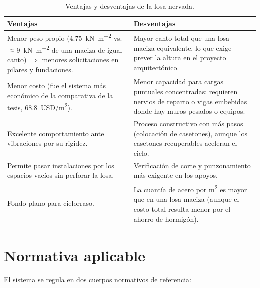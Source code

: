 \begin{table}[H]
\centering
\caption{Ventajas y desventajas de la losa nervada.}
\label{tab:ventajas}
\begin{tabular}{p{}p{}}
\toprule
\textbf{Ventajas} & \textbf{Desventajas} \\
\midrule
Menor peso propio (\SI{4,75}{\kilo\newton\per\square\meter} vs.\
$\approx$\SI{9}{\kilo\newton\per\square\meter} de una maciza de igual
canto) $\Rightarrow$ menores solicitaciones en pilares y fundaciones.
& Mayor canto total que una losa maciza equivalente, lo que exige
prever la altura en el proyecto arquitectónico. \\
Menor costo (fue el sistema más económico de la comparativa de la
tesis, \SI{68,8}{USD/m^2}).
& Menor capacidad para cargas puntuales concentradas: requieren nervios
de reparto o vigas embebidas donde hay muros pesados o equipos. \\
Excelente comportamiento ante vibraciones por su rigidez.
& Proceso constructivo con más pasos (colocación de casetones), aunque
los casetones recuperables aceleran el ciclo. \\
Permite pasar instalaciones por los espacios vacíos sin perforar la
losa.
& Verificación de corte y punzonamiento más exigente en los apoyos. \\
Fondo plano para cielorraso.
& La cuantía de acero por \si{\square\meter} es mayor que en una losa
maciza (aunque el costo total resulta menor por el ahorro de hormigón). \\
\bottomrule
\end{tabular}
\end{table}

\section{Normativa aplicable}
\label{sec:normativa}

El sistema se regula en dos cuerpos normativos de referencia:

